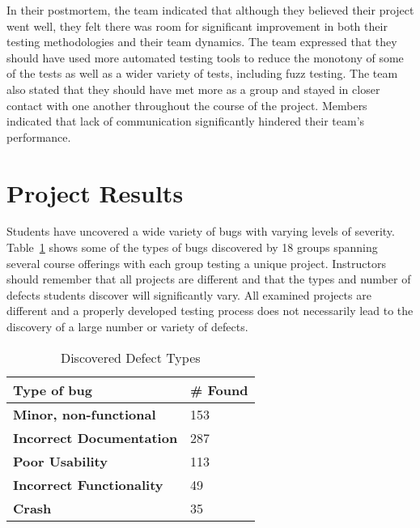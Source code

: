 \documentclass{sig-alternate}
\begin{document}
In their postmortem, the team indicated that although they believed their project went well, they felt there was room for significant improvement in both their testing methodologies and their team dynamics. The team expressed that they should have used more automated testing tools to reduce the monotony of some of the tests as well as a wider variety of tests, including fuzz testing. The team also stated that they should have met more as a group and stayed in closer contact with one another throughout the course of the project. Members indicated that lack of communication significantly hindered their team's performance.


\section{Project Results}
\label{sec: projectresults}

Students have uncovered a wide variety of bugs with varying levels of severity. Table~\ref{table:discovereddefecttypes} shows some of the types of bugs discovered by 18 groups spanning several course offerings with each group testing a unique project. Instructors should remember that all projects are different and that the types and number of defects students discover will significantly vary. All examined projects are different and a properly developed testing process does not necessarily lead to the discovery of a large number or variety of defects.


\begin{table}[h!]
\caption{Discovered Defect Types}
\begin{center}
    \begin{tabular}{ l | l }
    \toprule

	\bfseries Type of bug & \bfseries \# Found  \\ \hline \hline
	\bfseries Minor, non-functional & 153 \\ \hline
	\bfseries Incorrect Documentation & 287 \\ \hline
	\bfseries Poor Usability & 113  \\ \hline
	\bfseries Incorrect Functionality & 49  \\ \hline
	\bfseries Crash & 35 \\ \hline

    \end{tabular}
\end{center}

\label{table:discovereddefecttypes}
\end{table}
\end{document}
